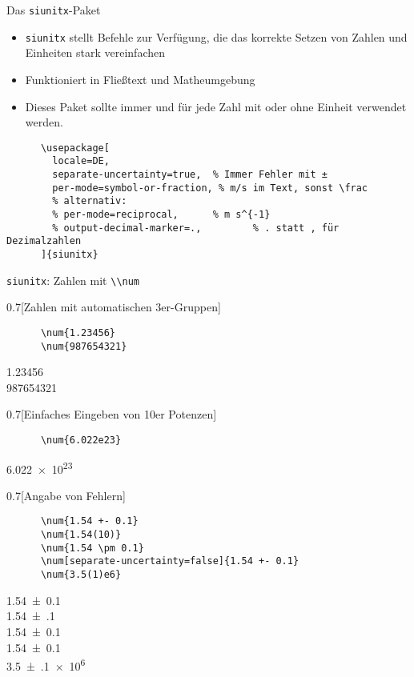 \begin{frame}[fragile]{
  Das \texttt{siunitx}-Paket
  \hfill
}
\begin{itemize}
    \item \texttt{siunitx} stellt Befehle zur Verfügung, die das korrekte Setzen von Zahlen und Einheiten stark vereinfachen
    \item Funktioniert in Fließtext und Matheumgebung
    \item[$\color{vertexDarkRed}\Rightarrow$] Dieses Paket sollte \alert{immer} und für \alert{jede} Zahl mit oder ohne Einheit verwendet werden.
\end{itemize}
  \begin{Packages}
    \begin{lstlisting}
      \usepackage[
        locale=DE,
        separate-uncertainty=true,  % Immer Fehler mit ±
        per-mode=symbol-or-fraction, % m/s im Text, sonst \frac
        % alternativ:
        % per-mode=reciprocal,      % m s^{-1}
        % output-decimal-marker=.,         % . statt , für Dezimalzahlen
      ]{siunitx}
    \end{lstlisting}
  \end{Packages}
\end{frame}

\begin{frame}[fragile]{\texttt{siunitx}: Zahlen mit \lstinline+\\num+}
  \begin{CodeExample}{0.7}[Zahlen mit automatischen 3er-Gruppen]
    \begin{lstlisting}
      \num{1.23456}
      \num{987654321}
    \end{lstlisting}
  \CodeResult
    \strut
    \num{1.23456} \\
    \num{987654321}
  \end{CodeExample}
  \begin{CodeExample}{0.7}[Einfaches Eingeben von 10er Potenzen]
    \begin{lstlisting}
      \num{6.022e23}
    \end{lstlisting}
  \CodeResult
    \strut
    \num{6.022e23}
  \end{CodeExample}
  \begin{CodeExample}{0.7}[Angabe von Fehlern]
    \begin{lstlisting}
      \num{1.54 +- 0.1}
      \num{1.54(10)}
      \num{1.54 \pm 0.1}
      \num[separate-uncertainty=false]{1.54 +- 0.1}
      \num{3.5(1)e6}
    \end{lstlisting}
  \CodeResult
    \strut
    \num{1.54 +- 0.1} \\
    \num{1.54(10)} \\
    \num{1.54 \pm 0.1} \\
    \num[separate-uncertainty=false]{1.54 +- 0.1} \\
    \num{3.5(1)e6}
  \end{CodeExample}
\end{frame}

